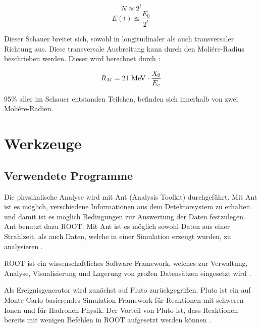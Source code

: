 \documentclass[a4paper,11pt,oneside,final,german,openbib,pdftex]{scrbook}
\begin{document}
{\begin{equation}
N\approxeq 2^t
\end{equation}
\begin{equation}
E(t) \approxeq \frac{E_0}{2^t}
\end{equation}

Dieser Schauer breitet sich, sowohl in longitudinaler als auch transversaler Richtung aus. Diese transversale Ausbreitung kann durch den Moli\'ere-Radius beschrieben werden. 
Dieser wird berechnet durch \cite{Leo87}:

\begin{equation}
R_M = 21 \textnormal{ MeV}\cdot \frac{X_0}{E_c}
\end{equation}

95\% aller im Schauer entstanden Teilchen, befinden sich innerhalb von zwei Moli\'ere-Radien. 

















\chapter{Werkzeuge}
\label{chap:Wergzeuge}
\section{Verwendete Programme}

Die physikalische Analyse wird mit Ant (Analysis Toolkit) durchgef\"uhrt. Mit Ant ist es m\"oglich, verschiedene Informationen aus dem Detektorsystem zu erhalten und damit ist es m\"oglich Bedingungen zur Auswertung der Daten festzulegen. Ant benutzt dazu ROOT. Mit Ant ist es m\"oglich sowohl Daten aus einer Strahlzeit, als auch Daten, welche in einer Simulation erzeugt wurden, zu analysieren \cite{Ant17}.

ROOT ist ein wissenschaftliches Software Framework, welches zur Verwaltung, Analyse, Visualisierung und Lagerung von gro{\ss}en Datens\"atzen eingesetzt wird \cite{Ce97}.

Als Ereignisgenerator wird zun\"achst auf Pluto zur\"uckgegriffen. Pluto ist ein auf Monte-Carlo basierendes Simulation Framework f\"ur Reaktionen mit schweren Ionen und f\"ur Hadronen-Physik. Der Vorteil von Pluto ist, dass Reaktionen bereits mit wenigen Befehlen in ROOT aufgesetzt werden k\"onnen \cite{Pl07}. 

}
\end{document}
